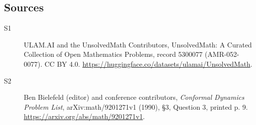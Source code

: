 \documentclass[11pt]{article}
\begin{document}
\subsection{Sources}
\begin{description}
\item[\hypertarget{source:5300077:1}{S1}] ULAM.AI and the UnsolvedMath Contributors, UnsolvedMath: A Curated Collection of Open Mathematics Problems, record 5300077 (AMR-052-0077). CC BY 4.0. \url{https://huggingface.co/datasets/ulamai/UnsolvedMath}.
\item[\hypertarget{source:5300077:2}{S2}] Ben Bielefeld (editor) and conference contributors, \emph{Conformal Dynamics Problem List}, arXiv:math/9201271v1 (1990), \S3, Question 3, printed p. 9. \url{https://arxiv.org/abs/math/9201271v1}.
\end{description}
\label{end:5300077}
\end{document}
